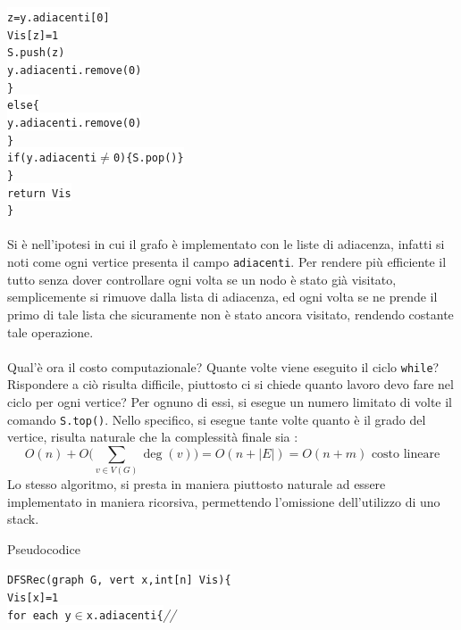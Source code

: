 \documentclass[12pt, letterpaper]{article}
\newcommand{\code}[1]{\colorbox{light-gray}{\texttt{#1}}}
\newcommand{\codee}[1]{\colorbox{white}{\texttt{#1}}}
\newcommand{\acc}{\\\hphantom{}\\}
\newcommand{\comm}[1]{\color{lg}\textit{\hphantom{spaz}// \text{#1}}\color{black}}
\begin{document}
\hphantom{ident}\hphantom{ident}\hphantom{ident}\codee{z=y.adiacenti[0]}\\
\hphantom{ident}\hphantom{ident}\hphantom{ident}\codee{Vis[z]=1}\\
\hphantom{ident}\hphantom{ident}\hphantom{ident}\codee{S.push(z)}\\
\hphantom{ident}\hphantom{ident}\hphantom{ident}\codee{y.adiacenti.remove(0)}\\
\hphantom{ident}\hphantom{ident}\codee{\}}\\
\hphantom{ident}\hphantom{ident}\codee{else\{}\\
\hphantom{ident}\hphantom{ident}\hphantom{ident}\codee{y.adiacenti.remove(0)}\\
\hphantom{ident}\hphantom{ident}\codee{\}}\\
\hphantom{ident}\hphantom{ident}\codee{if(y.adiacenti\(\ne\)0)\{S.pop()\}}\\
\hphantom{ident}\codee{\}}\\
\hphantom{ident}\codee{return Vis}\\
\codee{\}}\acc 
Si è nell'ipotesi in cui il grafo è implementato con le liste di adiacenza, infatti si noti come ogni vertice 
presenta il campo \code{adiacenti}. Per rendere più efficiente il tutto senza dover controllare ogni volta se un 
nodo è stato già visitato, semplicemente si rimuove dalla lista di adiacenza, ed ogni volta se ne prende il primo 
di tale lista che sicuramente non è stato ancora visitato, rendendo costante tale operazione.\acc 
Qual'è ora il costo computazionale? Quante  volte viene eseguito il ciclo \code{while}? Rispondere a ciò risulta 
difficile, piuttosto ci si chiede quanto lavoro devo fare nel ciclo per ogni vertice? Per ognuno di essi, si 
esegue un numero limitato di volte il comando \code{S.top()}. Nello specifico, si esegue tante volte quanto è il 
grado del vertice, risulta naturale che la complessità finale sia : 
$$O(n)+O\big( \sum_{v\in V(G)}\deg(v)\big)=O(n+|E|)=O(n+m)\text{ costo lineare}$$
Lo stesso algoritmo, si presta in maniera piuttosto naturale ad essere implementato in maniera ricorsiva, 
permettendo l'omissione dell'utilizzo di uno stack.\begin{center}
    Pseudocodice
\end{center} 
\codee{DFSRec(graph G, vert x,int[n] Vis)\{}\\
\hphantom{ident}\codee{Vis[x]=1}\\
\hphantom{ident}\codee{for each y\(\in\)x.adiacenti\{}\comm{per ogni adiacente di x}\\
\end{document}

